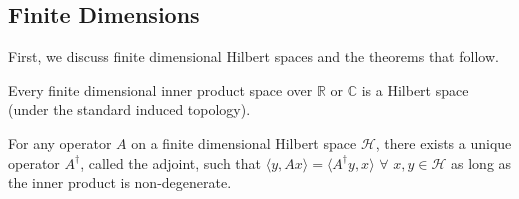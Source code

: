 \subsection{Finite Dimensions}
	First, we discuss finite dimensional Hilbert spaces and the theorems that follow.
	\begin{theorem}
		Every finite dimensional inner product space over $\mathbb{R}$ or $\mathbb{C}$ is a Hilbert space (under the standard induced topology).
	\end{theorem}
	\begin{theorem}
		For any operator $A$ on a finite dimensional Hilbert space $\mathcal{H}$, there exists a unique operator $A^\dagger$, called the adjoint, such that $\langle y, Ax\rangle = \langle A^\dagger y, x\rangle$ $\forall$ $x, y\in\mathcal{H}$ as long as the inner product is non-degenerate.
	\end{theorem}
